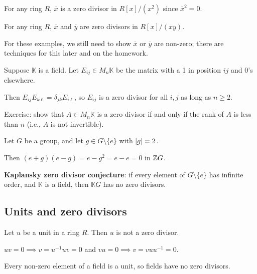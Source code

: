 \documentclass[12pt,letterpaper]{report}
\begin{document}
\begin{ex}
  For any ring $R$, $\overline{x}$ is a zero divisor in $R[x]/(x^2)$ since $\overline{x}^2 = 0$.
\end{ex}

\begin{ex}
  For any ring $R$, $\overline{x}$ and $\overline{y}$ are zero divisors in $R[x]/(xy)$.
\end{ex}

For these examples, we still need to show $\overline{x}$ or $\overline{y}$ are non-zero; there are
techniques for this later and on the homework.

\begin{ex}
  Suppose $\mathbb{K}$ is a field.
  Let $E_{ij} \in M_n\mathbb{K}$ be the matrix with a 1 in position $ij$ and 0's elsewhere.

  Then $E_{ij}E_{k\ell} = \delta_{jk}E_{i\ell}$, so $E_{ij}$ is a zero divisor for all $i, j$
  as long as $n \geq 2$.

  Exercise: show that $A \in M_n\mathbb{K}$ is a zero divisor if and only if the rank of $A$ is
  less than $n$ (i.e., $A$ is not invertible).
\end{ex}

\begin{ex}
  Let $G$ be a group, and let $g \in G \setminus \{e\}$ with $\lvert g\rvert = 2$.

  Then $(e + g)(e - g) = e - g^2 = e - e = 0$ in $\mathbb{Z} G$.

  \textbf{Kaplansky zero divisor conjecture}: if every element of $G \setminus \{e\}$ has infinite
  order, and $\mathbb{K}$ is a field, then $\mathbb{K}G$ has no zero divisors.
\end{ex}

\pagebreak
\subsection{Units and zero divisors}

\begin{lem}{}{}
  Let $u$ be a unit in a ring $R$.
  Then $u$ is not a zero divisor.
\end{lem}

\begin{thmproof}
  $uv = 0 \implies v = u^{-1}uv = 0$ and $vu = 0 \implies v = vuu^{-1} = 0$.
\end{thmproof}

Every non-zero element of a field is a unit, so fields have no zero divisors.
\end{document}
